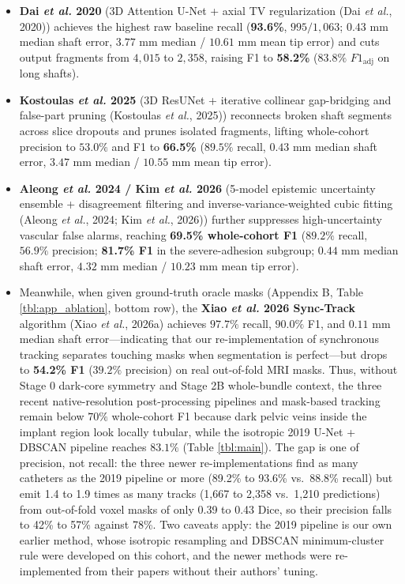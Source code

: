 \documentclass[
  11pt,
]{article}
\providecommand{\tightlist}{%
  \setlength{\itemsep}{0pt}\setlength{\parskip}{0pt}}
\begin{document}
\begin{itemize}
\tightlist
\item
  \textbf{Dai \emph{et al.} 2020} (3D Attention U-Net + axial TV
  regularization (Dai \emph{et al.}, 2020)) achieves the highest raw
  baseline recall (\textbf{93.6\%}, \(995/1,063\); \(0.43\text{ mm}\)
  median shaft error, \(3.77\text{ mm}\) median / \(10.61\text{ mm}\)
  mean tip error) and cuts output fragments from \(4,015\) to \(2,358\),
  raising F1 to \textbf{58.2\%} (\(83.8\%\) \(F1_{\text{adj}}\) on long
  shafts).
\item
  \textbf{Kostoulas \emph{et al.} 2025} (3D ResUNet + iterative
  collinear gap-bridging and false-part pruning (Kostoulas \emph{et
  al.}, 2025)) reconnects broken shaft segments across slice dropouts
  and prunes isolated fragments, lifting whole-cohort precision to
  \(53.0\%\) and F1 to \textbf{66.5\%} (\(89.5\%\) recall,
  \(0.43\text{ mm}\) median shaft error, \(3.47\text{ mm}\) median /
  \(10.55\text{ mm}\) mean tip error).
\item
  \textbf{Aleong \emph{et al.} 2024 / Kim \emph{et al.} 2026} (5-model
  epistemic uncertainty ensemble + disagreement filtering and
  inverse-variance-weighted cubic fitting (Aleong \emph{et al.}, 2024;
  Kim \emph{et al.}, 2026)) further suppresses high-uncertainty vascular
  false alarms, reaching \textbf{69.5\% whole-cohort F1} (\(89.2\%\)
  recall, \(56.9\%\) precision; \textbf{81.7\% F1} in the
  severe-adhesion subgroup; \(0.44\text{ mm}\) median shaft error,
  \(4.32\text{ mm}\) median / \(10.23\text{ mm}\) mean tip error).
\item
  Meanwhile, when given ground-truth oracle masks (Appendix B, Table
  \ref{tbl:app_ablation}, bottom row), the \textbf{Xiao \emph{et al.}
  2026 Sync-Track} algorithm (Xiao \emph{et al.}, 2026a) achieves
  \(97.7\%\) recall, \(90.0\%\) F1, and \(0.11\text{ mm}\) median shaft
  error---indicating that our re-implementation of synchronous tracking
  separates touching masks when segmentation is perfect---but drops to
  \textbf{54.2\% F1} (\(39.2\%\) precision) on real out-of-fold MRI
  masks. Thus, without Stage 0 dark-core symmetry and Stage 2B
  whole-bundle context, the three recent native-resolution
  post-processing pipelines and mask-based tracking remain below
  \(70\%\) whole-cohort F1 because dark pelvic veins inside the implant
  region look locally tubular, while the isotropic 2019 U-Net + DBSCAN
  pipeline reaches \(83.1\%\) (Table \ref{tbl:main}). The gap is one of
  precision, not recall: the three newer re-implementations find as many
  catheters as the 2019 pipeline or more (89.2\% to 93.6\% vs.~88.8\%
  recall) but emit 1.4 to 1.9 times as many tracks (1,667 to 2,358
  vs.~1,210 predictions) from out-of-fold voxel masks of only 0.39 to
  0.43 Dice, so their precision falls to 42\% to 57\% against 78\%. Two
  caveats apply: the 2019 pipeline is our own earlier method, whose
  isotropic resampling and DBSCAN minimum-cluster rule were developed on
  this cohort, and the newer methods were re-implemented from their
  papers without their authors' tuning.
\end{itemize}
\end{document}
